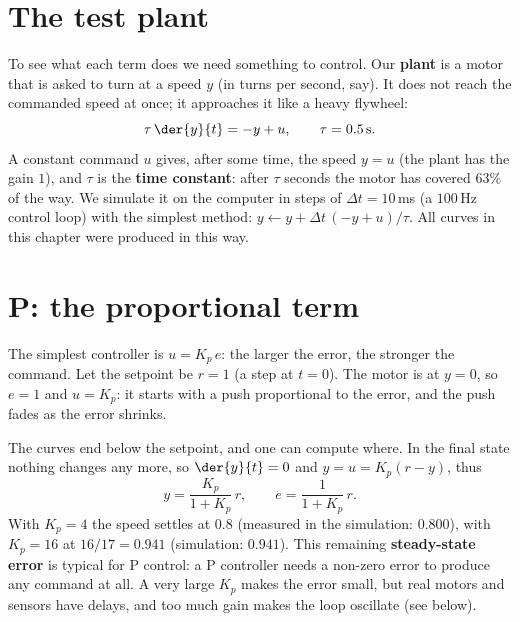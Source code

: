 \section*{The test plant}
To see what each term does we need something to control. Our \textbf{plant} is a motor that is asked to turn at a speed $y$ (in turns per second, say). It does not reach the commanded speed at once; it approaches it like a heavy flywheel:
\[
\tau\,\der{y}{t}=-y+u ,\qquad \tau=0.5\,\text{s}.
\]
A constant command $u$ gives, after some time, the speed $y=u$ (the plant has the gain $1$), and $\tau$ is the \textbf{time constant}: after $\tau$ seconds the motor has covered $63\%$ of the way. We simulate it on the computer in steps of $\Delta t=10$\,ms (a $100$\,Hz control loop) with the simplest method: $y\leftarrow y+\Delta t\,(-y+u)/\tau$. All curves in this chapter were produced in this way.

\section*{P: the proportional term}
The simplest controller is $u=K_p\,e$: the larger the error, the stronger the command. Let the setpoint be $r=1$ (a step at $t=0$). The motor is at $y=0$, so $e=1$ and $u=K_p$: it starts with a push proportional to the error, and the push fades as the error shrinks.

\begin{center}
\end{center}

The curves end below the setpoint, and one can compute where. In the final state nothing changes any more, so $\der{y}{t}=0$ and $y=u=K_p(r-y)$, thus
\[
y=\frac{K_p}{1+K_p}\,r,\qquad e=\frac{1}{1+K_p}\,r .
\]
With $K_p=4$ the speed settles at $0.8$ (measured in the simulation: $0.800$), with $K_p=16$ at $16/17=0.941$ (simulation: $0.941$). This remaining \textbf{steady-state error} is typical for P control: a P controller needs a non-zero error to produce any command at all. A very large $K_p$ makes the error small, but real motors and sensors have delays, and too much gain makes the loop oscillate (see below).

